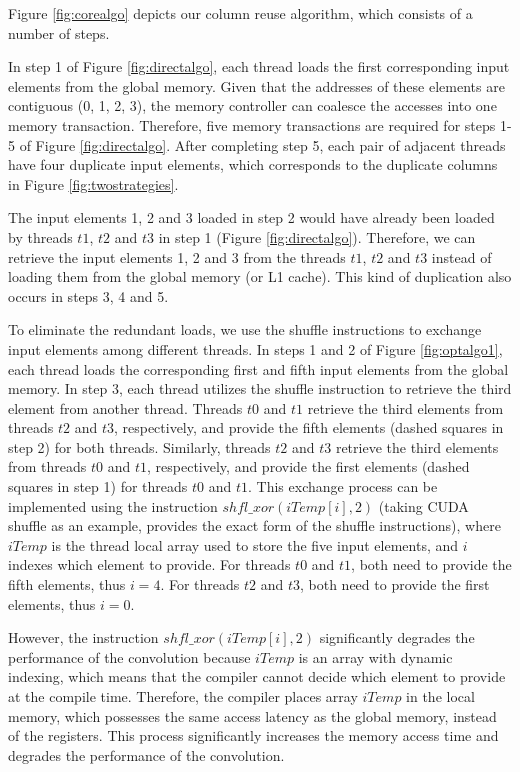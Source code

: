 Figure \ref{fig:corealgo} depicts our column reuse algorithm, which consists of a number of steps.

 In step 1 of Figure \ref{fig:directalgo}, each thread loads the first corresponding input elements from the
global memory. Given that the addresses of these elements are contiguous (0, 1, 2, 3), the memory controller can coalesce the accesses into
one memory transaction. Therefore, five memory transactions are required for steps 1-5 of Figure \ref{fig:directalgo}. After completing step 5, each pair of adjacent threads have four
duplicate input elements, which corresponds to the duplicate columns in Figure \ref{fig:twostrategies}.

The input elements 1, 2 and 3 loaded in step 2 would have already been loaded by threads $t1$, $t2$ and $t3$ in step 1 (Figure
\ref{fig:directalgo}). Therefore, we can retrieve the input elements 1, 2 and 3 from the threads $t1$, $t2$ and $t3$ instead of loading
them from the global memory (or L1 cache). This kind of duplication also occurs in steps 3, 4 and 5.

To eliminate the redundant loads, we use the shuffle instructions to exchange input elements among different threads. In steps 1
and 2 of Figure \ref{fig:optalgo1}, each thread loads the corresponding first and fifth input elements from the global memory. In step 3, each
thread utilizes the shuffle instruction to retrieve the third element from another thread. Threads $t0$ and $t1$ retrieve the third elements
from threads $t2$ and $t3$, respectively, and provide the fifth elements (dashed squares in step 2) for both threads.
Similarly, threads $t2$ and $t3$ retrieve the third elements from threads $t0$ and $t1$, respectively, and provide the first
elements (dashed squares in step 1) for threads $t0$ and $t1$. This exchange process can be implemented using the instruction
$shfl\_xor(iTemp[i],2)$ (taking CUDA shuffle as an example, \cite{CUDAtoolkit} provides the exact form of the shuffle instructions), where $iTemp$ is the thread local
array used to store the five input elements, and $i$ indexes which element to provide. For threads $t0$ and $t1$, both need to provide the fifth
elements, thus $i=4$. For threads $t2$ and $t3$, both need to provide the first elements, thus $i=0$. 

However, the instruction $shfl\_xor(iTemp[i],2)$ significantly degrades the performance of the convolution because $iTemp$ is an array with
dynamic indexing, which means that the compiler cannot decide which element to provide at the compile time. Therefore, the compiler
places array $iTemp$ in the local memory, which possesses the same access latency as the global memory, instead of the registers. This process significantly increases the memory access time and degrades the performance of the convolution.


